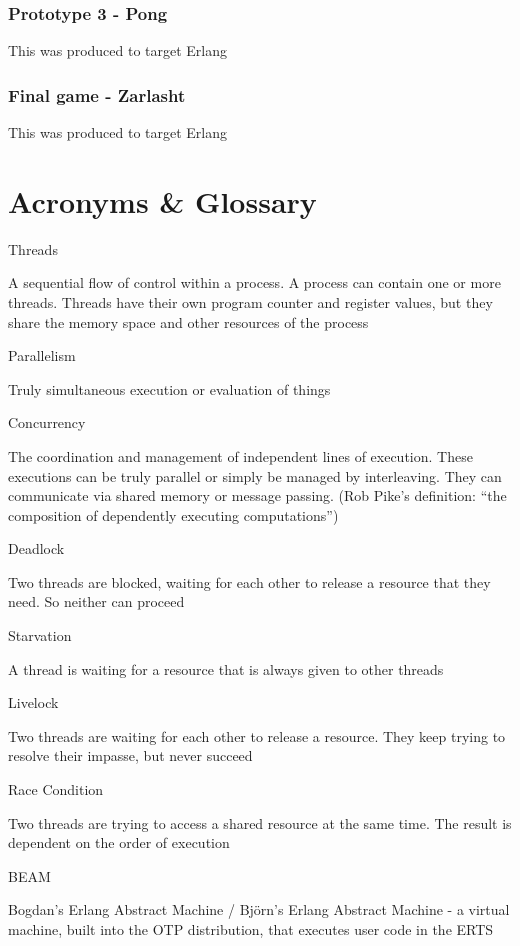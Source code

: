 \documentclass[]{final}
\begin{document}
\subsection{Prototype 3 - Pong}
This was produced to target Erlang%
\subsection{Final game - Zarlasht}
This was produced to target Erlang%

\chapter{Acronyms \& Glossary}
Threads

A sequential flow of control within a process. A process can contain one or more threads.
Threads have their own program counter and register values, but they share the memory space
and other resources of the process

Parallelism

Truly simultaneous execution or evaluation of things

Concurrency

The coordination and management of independent lines of execution. These executions
can be truly parallel or simply be managed by interleaving. They can communicate
via shared memory or message passing. (Rob Pike's definition: “the composition of
dependently executing computations”)

Deadlock

Two threads are blocked, waiting for each other to release a resource that they need. So neither can proceed

Starvation

A thread is waiting for a resource that is always given to other threads

Livelock

Two threads are waiting for each other to release a resource. They keep trying to resolve their impasse, but never succeed

Race Condition

Two threads are trying to access a shared resource at the same time. The result is dependent on the order of execution

BEAM

Bogdan's Erlang Abstract Machine / Björn's Erlang Abstract Machine - a virtual machine, built into the OTP
distribution, that executes user code in the ERTS
\end{document}
